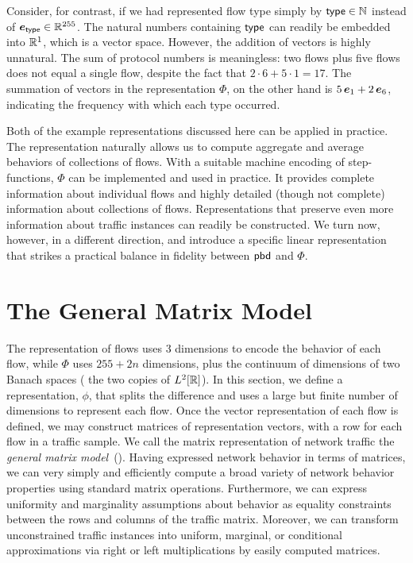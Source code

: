 \documentclass[twocolumn,final]{svjour3}
\begin{document}
Consider, for contrast, if we had represented flow type simply by $\text{\textsf{type}} \in \mathbb{N}$ instead of $\e_\type \in \R^{255}$.
The natural numbers containing $\text{\textsf{type}}$ can readily be embedded into $\mathbb{R}^1$, which is a vector space.
However, the addition of vectors is highly unnatural.
The sum of protocol numbers is meaningless:
two  flows plus five  flows does not equal a single  flow, despite the fact that $2\cdot6+5\cdot1=17$.
The summation of vectors in the representation $\Phi$, on the other hand is $5\,\e_1+2\,\e_6$, indicating the frequency with which each type occurred.

Both of the example representations discussed here can be applied in practice.
The  representation naturally allows us to compute aggregate and average  behaviors of collections of flows.
With a suitable machine encoding of step-functions, $\Phi$ can be implemented and used in practice.
It provides complete information about individual flows and highly detailed (though not complete) information about collections of flows.
Representations that preserve even more information about traffic instances can readily be constructed.
We turn now, however, in a different direction, and introduce a specific linear representation that strikes a practical balance in fidelity between $\text{\textsf{pbd}}$ and $\Phi$.

\section{The General Matrix Model}



The  representation of flows uses 3 dimensions to encode the behavior of each flow, while $\Phi$ uses $255+2n$ dimensions, plus the continuum of dimensions of two Banach spaces ( the two copies of $L^2[\mathbb{R}]$).
In this section, we define a representation, $\phi$, that splits the difference and uses a large but finite number of dimensions to represent each flow.
Once the vector representation of each flow is defined, we may construct matrices of representation vectors, with a row for each flow in a traffic sample.
We call the matrix representation of network traffic the \emph{general matrix model}~().
Having expressed network behavior in terms of matrices, we can very simply and efficiently compute a broad variety of network behavior properties using standard matrix operations.
Furthermore, we can express uniformity and marginality assumptions about behavior as equality constraints between the rows and columns of the traffic matrix.
Moreover, we can transform unconstrained traffic instances into uniform, marginal, or conditional approximations via right or left multiplications by easily computed matrices.
\end{document}
